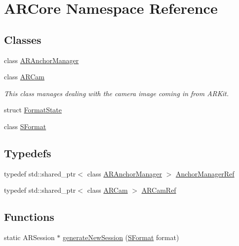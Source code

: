 \hypertarget{namespace_a_r_core}{}\section{A\+R\+Core Namespace Reference}
\label{namespace_a_r_core}
\subsection*{Classes}
\begin{DoxyCompactItemize}
\item 
class \hyperlink{class_a_r_core_1_1_a_r_anchor_manager}{A\+R\+Anchor\+Manager}
\item 
class \hyperlink{class_a_r_core_1_1_a_r_cam}{A\+R\+Cam}
\begin{DoxyCompactList}\small\item\em This class manages dealing with the camera image coming in from A\+R\+Kit. \end{DoxyCompactList}\item 
struct \hyperlink{struct_a_r_core_1_1_format_state}{Format\+State}
\item 
class \hyperlink{class_a_r_core_1_1_s_format}{S\+Format}
\end{DoxyCompactItemize}
\subsection*{Typedefs}
\begin{DoxyCompactItemize}
\item 
typedef std\+::shared\+\_\+ptr$<$ class \hyperlink{class_a_r_core_1_1_a_r_anchor_manager}{A\+R\+Anchor\+Manager} $>$ \hyperlink{namespace_a_r_core_a3f2b9ba00b51ce19c1010f554a66a512}{Anchor\+Manager\+Ref}
\item 
typedef std\+::shared\+\_\+ptr$<$ class \hyperlink{class_a_r_core_1_1_a_r_cam}{A\+R\+Cam} $>$ \hyperlink{namespace_a_r_core_a4ebe9e23907235fcf76bf65440fde0e0}{A\+R\+Cam\+Ref}
\end{DoxyCompactItemize}
\subsection*{Functions}
\begin{DoxyCompactItemize}
\item 
static A\+R\+Session $\ast$ \hyperlink{namespace_a_r_core_a66ae704f1eff4b085765cc73635db8eb}{generate\+New\+Session} (\hyperlink{class_a_r_core_1_1_s_format}{S\+Format} format)
\end{DoxyCompactItemize}


